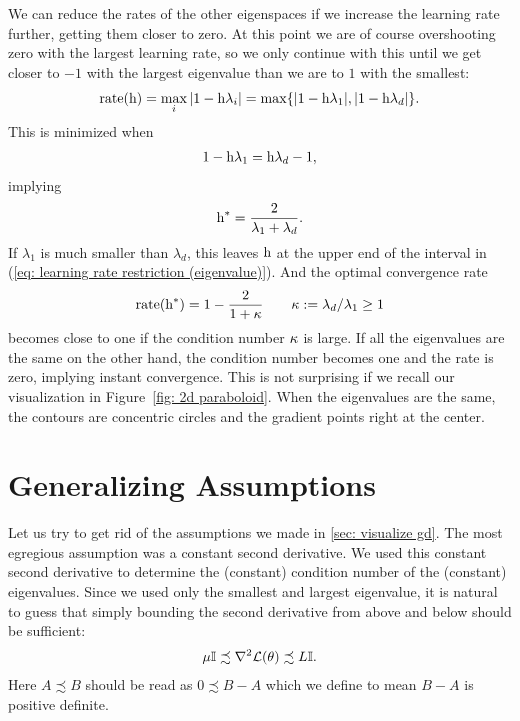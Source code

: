 We can reduce the rates of the other eigenspaces if we
increase the learning rate further, getting them closer to zero. At this point
we are of course overshooting zero with the largest learning rate, so we only
continue with this until we get closer to \(-1\) with the largest eigenvalue
than we are to \(1\) with the smallest:
%
\begin{align*}
	\text{rate}(\text{h})=\max_{i} |1-\text{h}\lambda_i| = \max\{|1-\text{h}\lambda_1|, |1-\text{h}\lambda_d|\}.
\end{align*}
%
This is minimized when
%
\begin{align*}
	1-\text{h}\lambda_1 = \text{h}\lambda_d -1,
\end{align*}
%
implying
%
\begin{align*}
	\text{h}^* = \frac{2}{\lambda_1 + \lambda_d}.
\end{align*}
%
If \(\lambda_1\) is much smaller than \(\lambda_d\), this leaves \(\text{h}\)
at the upper end of the interval in (\ref{eq: learning rate restriction
(eigenvalue)}). And the optimal convergence rate
%
\begin{align*}
	\text{rate}(\text{h}^*)
	= 1 - \frac{2}{1+\kappa}
	\qquad \kappa:=\lambda_d/\lambda_1 \ge 1
\end{align*}
%
becomes close to one if the condition number \(\kappa\) is large.
If all the eigenvalues are the same on the other hand, the condition number
becomes one and the rate is zero, implying instant convergence. This is not
surprising if we recall our visualization in Figure~\ref{fig: 2d paraboloid}.
When the eigenvalues are the same, the contours are concentric circles and the
gradient points right at the center.


\section{Generalizing Assumptions}

Let us try to get rid of the assumptions we made in \ref{sec: visualize gd}.
The most egregious assumption was a constant second derivative. We used this
constant second derivative to determine the (constant) condition number of
the (constant) eigenvalues. Since we used only the smallest and largest
eigenvalue, it is natural to guess that simply bounding the second derivative
from above and below should be sufficient:
%
\begin{align*}
	\mu \mathbb{I} \precsim \nabla^2 \mathcal{L}(\theta) \precsim L \mathbb{I}.
\end{align*}
%
Here \(A \precsim B\) should be read as \(0\precsim B-A\) which we define to mean
\(B-A\) is positive definite.

